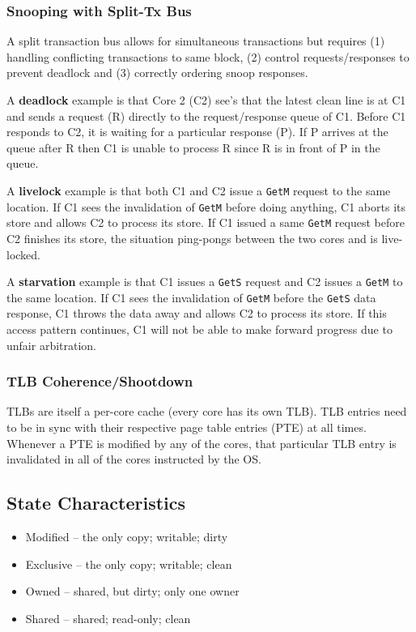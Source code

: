 \documentclass{article}
\begin{document}
\begin{multicols*}{2}
\subsubsection{Snooping with Split-Tx Bus}
A split transaction bus allows for simultaneous transactions but requires (1) handling conflicting transactions to same block, (2) control requests/responses to prevent deadlock and (3) correctly ordering snoop responses.
\medskip\par\noindent
A \textbf{deadlock} example is that Core 2 (C2) see's that the latest clean line is at C1 and sends a request (R) directly to the request/response queue of C1. Before C1 responds to C2, it is waiting for a particular response (P). If P arrives at the queue after R then C1 is unable to process R since R is in front of P in the queue.
\medskip\par\noindent
A \textbf{livelock} example is that both C1 and C2 issue a \texttt{GetM} request to the same location. If C1 sees the invalidation of \texttt{GetM} before doing anything, C1 aborts its store and allows C2 to process its store. If C1 issued a same \texttt{GetM} request before C2 finishes its store, the situation ping-pongs between the two cores and is live-locked.
\medskip\par\noindent
A \textbf{starvation} example is that C1 issues a \texttt{GetS} request and C2 issues a \texttt{GetM} to the same location. If C1 sees the invalidation of \texttt{GetM} before the \texttt{GetS} data response, C1 throws the data away and allows C2 to process its store. If this access pattern continues, C1 will not be able to make forward progress due to unfair arbitration.

\subsubsection{TLB Coherence/Shootdown}
TLBs are itself a per-core cache (every core has its own TLB). TLB entries need to be in sync with their respective page table entries (PTE) at all times. Whenever a PTE is modified by any of the cores, that particular TLB entry is invalidated in all of the cores instructed by the OS.

\subsection{State Characteristics}
\begin{itemize}
    \item Modified  – the only copy; writable; dirty
    \item Exclusive – the only copy; writable; clean
    \item Owned     – shared, but dirty; only one owner
    \item Shared    – shared; read-only; clean
\end{itemize}


\end{multicols*}
\end{document}
